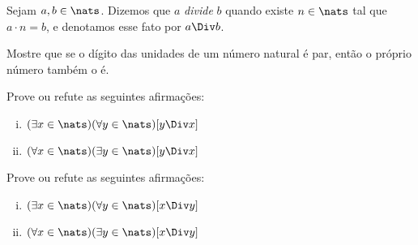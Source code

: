 \begin{definition}
Sejam $a,b \in \nats$. Dizemos que $a$ \textit{divide} $b$ quando existe $n \in \nats$ tal que $a \cdot n = b$, e denotamos esse fato por $a \Div b$.
\end{definition}

\begin{exercise}
%
Mostre que se o dígito das unidades de um número natural é par, então o próprio número também o é.
\end{exercise}

\begin{exercise}
%
Prove ou refute as seguintes afirmações:

\begin{enumerate}[(i)]
\item $(\exists x \in \nats)( \forall y \in \nats)[ y \Div x]$
\item $(\forall x \in \nats)( \exists y \in \nats)[ y \Div x]$
\end{enumerate}

\begin{homework}
%
Prove ou refute as seguintes afirmações:
\begin{enumerate}[(i)]
\item $(\exists x \in \nats)( \forall y \in \nats)[ x \Div y]$
\item $(\forall x \in \nats)( \exists y \in \nats)[ x \Div y]$
\end{enumerate}
\end{homework}

\end{exercise}